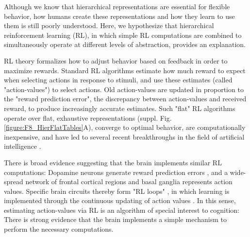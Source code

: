 \documentclass[10pt,letterpaper]{article}  %
\newcommand{\rev}{\color{black}}
\begin{document}
Although we know that hierarchical representations are essential for flexible behavior, how humans create these representations and how they learn to use them is still poorly understood. Here, we hypothesize that hierarchical reinforcement learning (RL), in which simple RL computations are combined to simultaneously operate at different levels of abstraction, provides an explanation. %

RL theory \cite{sutton_reinforcement_2017} formalizes how to adjust behavior based on feedback in order to maximize rewards. Standard RL algorithms estimate how much reward to expect when selecting actions in response to stimuli, and use these estimates (called "action-values") to select actions. Old action-values are updated in proportion to the "reward prediction error", the discrepancy between action-values and received reward, to produce increasingly accurate estimates. Such "flat" RL algorithms operate over flat, exhaustive representations (suppl. Fig. \ref{figure:F8_HierFlatTables}A), converge to optimal behavior, are computationally inexpensive, and have led to several recent breakthroughs in the field of artificial intelligence \cite{sutton_reinforcement_2017}. %

There is broad evidence suggesting that the brain implements similar RL computations: Dopamine neurons generate reward prediction errors \cite{schultz_neural_1997, bayer_midbrain_2005}, and a wide-spread network of frontal cortical regions \cite{lee_neural_2012} and basal ganglia \cite{abler_prediction_2006, tai_transient_2012} represents action values. Specific brain circuits thereby form "RL loops" \cite{alexander_parallel_1986, collins_cognitive_2013}, in which learning is implemented through the continuous updating of action values \cite{schultz_updating_2013, niv_reinforcement_2015}.
{\rev In this sense, estimating action-values via RL is an algorithm of special interest to cognition: There is strong evidence that the brain implements a simple mechanism to perform the necessary computations.} 
\end{document}
